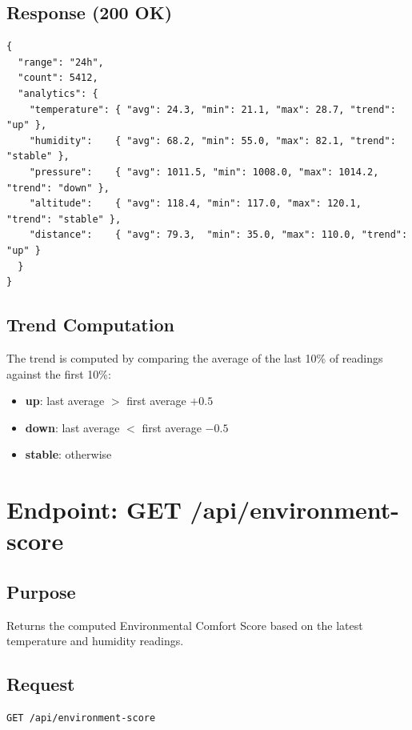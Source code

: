 \subsection{Response (200 OK)}
\begin{lstlisting}[language={},caption={GET /api/analytics success response}]
{
  "range": "24h",
  "count": 5412,
  "analytics": {
    "temperature": { "avg": 24.3, "min": 21.1, "max": 28.7, "trend": "up" },
    "humidity":    { "avg": 68.2, "min": 55.0, "max": 82.1, "trend": "stable" },
    "pressure":    { "avg": 1011.5, "min": 1008.0, "max": 1014.2, "trend": "down" },
    "altitude":    { "avg": 118.4, "min": 117.0, "max": 120.1, "trend": "stable" },
    "distance":    { "avg": 79.3,  "min": 35.0, "max": 110.0, "trend": "up" }
  }
}
\end{lstlisting}

\subsection{Trend Computation}
The trend is computed by comparing the average of the last 10\% of readings against the first 10\%:
\begin{itemize}[leftmargin=1.5em]
  \item \textbf{up}: last average $>$ first average $+ 0.5$
  \item \textbf{down}: last average $<$ first average $- 0.5$
  \item \textbf{stable}: otherwise
\end{itemize}

\section{Endpoint: GET /api/environment-score}

\subsection{Purpose}
Returns the computed Environmental Comfort Score based on the latest temperature and humidity readings.

\subsection{Request}
\begin{lstlisting}[language={},caption={GET /api/environment-score request}]
GET /api/environment-score
\end{lstlisting}

